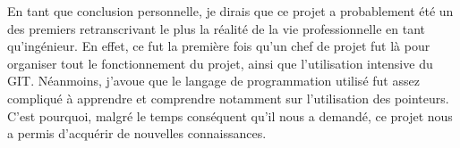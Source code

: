 En tant que conclusion personnelle, je dirais que ce projet a probablement été un des premiers retranscrivant le plus la réalité de la vie professionnelle en tant qu'ingénieur. En effet, ce fut la première fois qu'un chef de projet fut là pour organiser tout le fonctionnement du projet, ainsi que l'utilisation intensive du GIT. Néanmoins, j'avoue que le langage de programmation utilisé fut assez compliqué à apprendre et comprendre notamment sur l'utilisation des pointeurs. C'est pourquoi, malgré le temps conséquent qu'il nous a demandé, ce projet nous a permis d'acquérir de nouvelles connaissances.
